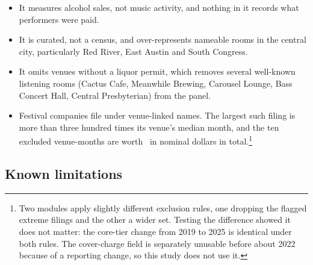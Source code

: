 \begin{itemize}
\item It measures alcohol sales, not music activity, and nothing in it
      records what performers were paid.
\item It is curated, not a census, and over-represents nameable rooms in
      the central city, particularly Red River, East Austin and South
      Congress.
\item It omits venues without a liquor permit, which removes several
      well-known listening rooms (Cactus Cafe, Meanwhile Brewing, Carousel
      Lounge, Bass Concert Hall, Central Presbyterian) from the panel.
\item Festival companies file under venue-linked names. The largest such
      filing is more than three hundred times its venue's median month, and
      the ten excluded venue-months are worth
      \NVenueFestivalDollarsExcluded\ in nominal dollars in total.\footnote{Two modules
      apply slightly different exclusion rules, one dropping the flagged
      extreme filings and the other a wider set. Testing the difference
      showed it does not matter: the core-tier change from 2019 to 2025 is
      identical under both rules. The cover-charge field is separately
      unusable before about 2022 because of a reporting change, so this
      study does not use it.}
\end{itemize}

\subsection{Known limitations}

